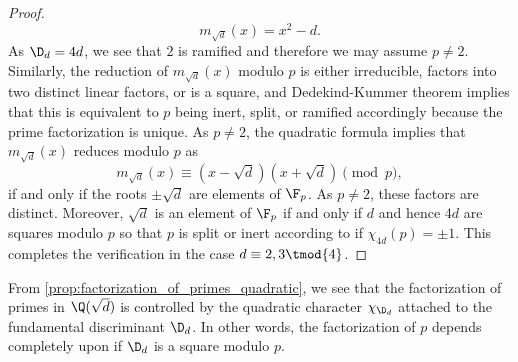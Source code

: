 \begin{proof}
      \[
        m_{\sqrt{d}}(x) = x^{2}-d.
      \]
      As $\D_{d} = 4d$, we see that $2$ is ramified and therefore we may assume $p \neq 2$. Similarly, the reduction of $m_{\sqrt{d}}(x)$ modulo $p$ is either irreducible, factors into two distinct linear factors, or is a square, and Dedekind-Kummer theorem implies that this is equivalent to $p$ being inert, split, or ramified accordingly because the prime factorization is unique. As $p \neq 2$, the quadratic formula implies that $m_{\sqrt{d}}(x)$ reduces modulo $p$ as
      \[
        m_{\sqrt{d}}(x) \equiv (x-\sqrt{d})(x+\sqrt{d}) \pmod{p},
      \]
      if and only if the roots $\pm\sqrt{d}$ are elements of $\F_{p}$. As $p \neq 2$, these factors are distinct. Moreover, $\sqrt{d}$ is an element of $\F_{p}$ if and only if $d$ and hence $4d$ are squares modulo $p$ so that $p$ is split or inert according to if $\chi_{4d}(p) = \pm1$. This completes the verification in the case $d \equiv 2,3 \tmod{4}$.
    \end{proof}

    From \cref{prop:factorization_of_primes_quadratic}, we see that the factorization of primes in $\Q(\sqrt{d})$ is controlled by the quadratic character $\chi_{\D_{d}}$ attached to the fundamental discriminant $\D_{d}$. In other words, the factorization of $p$ depends completely upon if $\D_{d}$ is a square modulo $p$.

